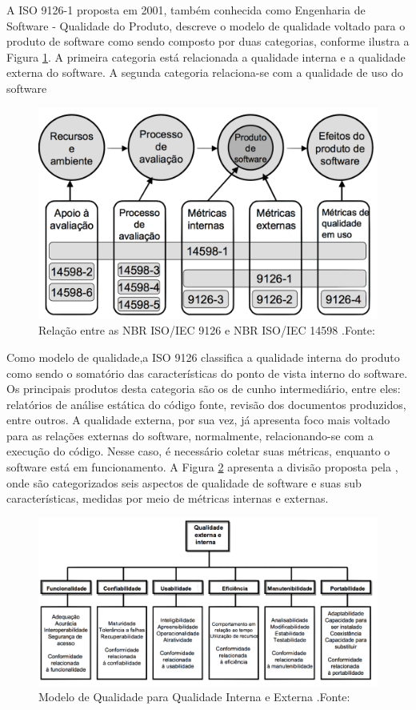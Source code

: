  A ISO 9126-1 proposta em 2001, também conhecida como Engenharia de Software - Qualidade do Produto, descreve o modelo de qualidade voltado para o produto de software como sendo composto por duas categorias, conforme ilustra a Figura \ref{img:relacao_iso}. A primeira categoria está relacionada a qualidade interna e a qualidade externa do software. A segunda categoria relaciona-se com a qualidade de uso do software \cite{_nbr_2016}
\graphicspath{{figuras/}}
\begin{figure}[h!]
\centering
\includegraphics[scale=0.40]{ISO}
\caption{Relação entre as NBR ISO/IEC 9126 e NBR ISO/IEC 14598 .Fonte:\cite{_nbr_2016}}
\label{img:relacao_iso}
\end{figure}

Como modelo de qualidade,a ISO 9126 classifica a qualidade interna do produto como sendo o somatório das características do ponto de vista interno do software. Os principais produtos desta categoria são os de cunho intermediário, entre eles: relatórios de análise estática do código fonte, revisão dos documentos produzidos, entre outros. A qualidade externa, por sua vez, já apresenta foco mais voltado para as relações externas do software, normalmente, relacionando-se com a execução do código. Nesse caso, é necessário coletar suas métricas, enquanto o software está em funcionamento. A Figura \ref{img:modelo_qualidade} apresenta a divisão proposta pela \cite{_nbr_2016}, onde são categorizados seis aspectos de qualidade de software e suas sub características, medidas por meio de métricas internas e externas.
\graphicspath{{figuras/}}
\begin{figure}[h]
\centering
\includegraphics[scale=0.50]{Modelo_de_Qualidade}
\caption{Modelo de Qualidade para Qualidade Interna e Externa .Fonte:\cite{_nbr_2016}}
\label{img:modelo_qualidade}
\end{figure}

